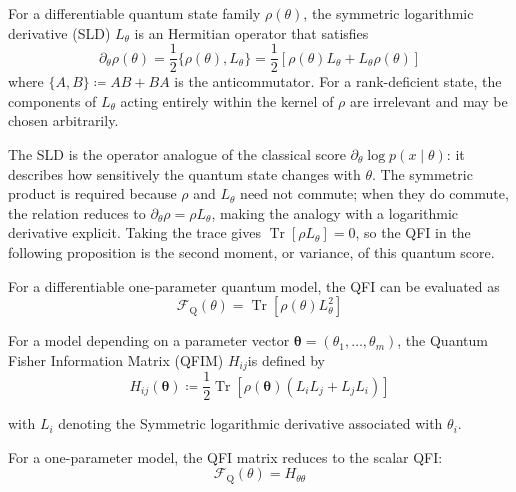 \begin{definition}
    For a differentiable quantum state family $\rho(\theta)$, the symmetric logarithmic derivative (SLD) $L_\theta$ is an Hermitian operator that satisfies
    \begin{equation}
        \partial_\theta\rho(\theta)
        =\frac{1}{2}\{\rho(\theta),L_\theta\}
        =\frac{1}{2}\left[\rho(\theta)L_\theta+L_\theta\rho(\theta)\right]
        \label{eq:sld_lyapunov}
    \end{equation}
    where $\{A,B\}\coloneqq AB+BA$ is the anticommutator. For a rank-deficient state, the components of $L_\theta$ acting entirely within the kernel of $\rho$ are irrelevant and may be chosen arbitrarily.
\end{definition}

\begin{remark}
    The SLD is the operator analogue of the classical score $\partial_\theta\log p(x\mid\theta)$: it describes how sensitively the quantum state changes with $\theta$. The symmetric product is required because $\rho$ and $L_\theta$ need not commute; when they do commute, the relation reduces to $\partial_\theta\rho=\rho L_\theta$, making the analogy with a logarithmic derivative explicit. Taking the trace gives $\operatorname{Tr}[\rho L_\theta]=0$, so the QFI in the following proposition is the second moment, or variance, of this quantum score.
\end{remark}

\begin{proposition}
    For a differentiable one-parameter quantum model, the QFI can be evaluated as
    \begin{equation}
        \mathcal{F}_{\mathrm{Q}}(\theta)
        =
        \operatorname{Tr}
        \left[
            \rho(\theta)L_\theta^2
            \right]
        \label{eq:qfi_sld}
    \end{equation}
\end{proposition}

\begin{definition}
    For a model depending on a parameter vector
    $\boldsymbol{\theta}=(\theta_1,\ldots,\theta_m)$, the Quantum Fisher Information Matrix (QFIM) $H_{ij}$is defined by
    \begin{equation}
        H_{ij}(\boldsymbol{\theta})
        \coloneqq
        \frac{1}{2}
        \operatorname{Tr}
        \left[
            \rho(\boldsymbol{\theta})
            \left(L_iL_j+L_jL_i\right)
            \right]
        \label{eq:qfim}
    \end{equation}

    with $L_i$ denoting the Symmetric logarithmic derivative associated with $\theta_i$.

    For a one-parameter model, the QFI matrix reduces to the scalar QFI:
    \begin{equation}
        \mathcal{F}_{\mathrm{Q}}(\theta)
        =
        H_{\theta\theta}
    \end{equation}
\end{definition}

